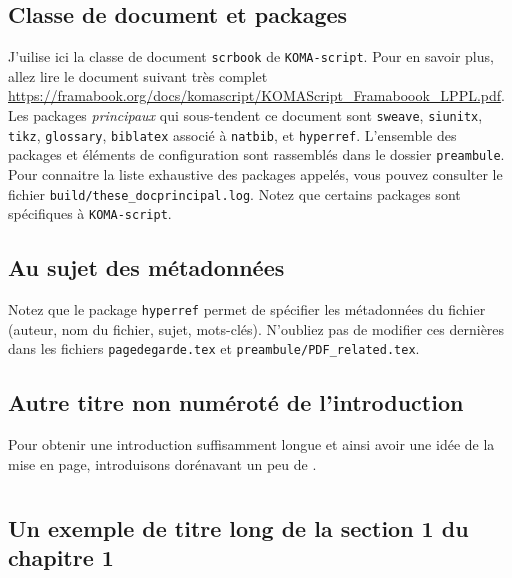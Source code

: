 \section*{Classe de document et packages}

J'uilise ici la classe de document \verb!scrbook! de \verb!KOMA-script!. Pour en savoir plus, allez lire le document suivant très complet \url{https://framabook.org/docs/komascript/KOMAScript_Framaboook_LPPL.pdf}. Les packages \emph{principaux} qui sous-tendent ce document sont \verb!sweave!, \verb!siunitx!, \verb!tikz!, \verb!glossary!, \verb!biblatex! associé à \verb!natbib!, et \verb!hyperref!. L'ensemble des packages et éléments de configuration sont rassemblés dans le dossier \verb!preambule!. Pour connaitre la liste exhaustive des packages appelés, vous pouvez consulter le fichier \verb!build/these_docprincipal.log!. Notez que certains packages sont spécifiques à \verb!KOMA-script!. 

\section*{Au sujet des métadonnées}

Notez que le package \verb!hyperref! permet de spécifier les métadonnées du fichier (auteur, nom du fichier, sujet, mots-clés). N'oubliez pas de modifier ces dernières dans les fichiers \verb!pagedegarde.tex! et \verb!preambule/PDF_related.tex!. 

\section*{Autre titre non numéroté de l'introduction}

Pour obtenir une introduction suffisamment longue et ainsi avoir une idée de la mise en page, introduisons dorénavant un peu de .

\lipsum[3-4]

\chapter[Dans le texte]{  \label{chap:1}}%
\glsresetall %

\section[Titre court de la section 1]{Un exemple de titre long de la section 1 du chapitre 1}\label{sec:11}

